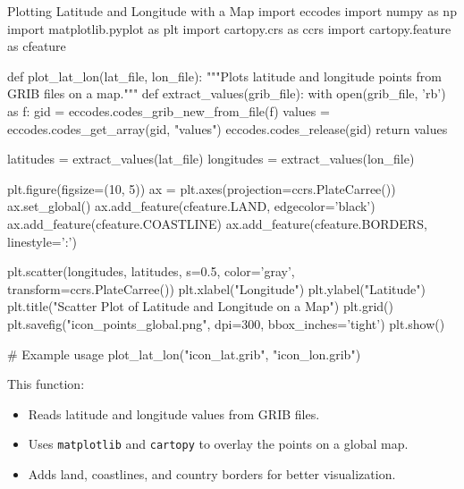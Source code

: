 \begin{codeonly}{Plotting Latitude and Longitude with a Map}
import eccodes
import numpy as np
import matplotlib.pyplot as plt
import cartopy.crs as ccrs
import cartopy.feature as cfeature

def plot_lat_lon(lat_file, lon_file):
    """Plots latitude and longitude points from GRIB files on a map."""
    def extract_values(grib_file):
        with open(grib_file, 'rb') as f:
            gid = eccodes.codes_grib_new_from_file(f)
            values = eccodes.codes_get_array(gid, "values")
            eccodes.codes_release(gid)
        return values
    
    latitudes = extract_values(lat_file)
    longitudes = extract_values(lon_file)
    
    plt.figure(figsize=(10, 5))
    ax = plt.axes(projection=ccrs.PlateCarree())
    ax.set_global()
    ax.add_feature(cfeature.LAND, edgecolor='black')
    ax.add_feature(cfeature.COASTLINE)
    ax.add_feature(cfeature.BORDERS, linestyle=':')
    
    plt.scatter(longitudes, latitudes, s=0.5, color='gray', transform=ccrs.PlateCarree())
    plt.xlabel("Longitude")
    plt.ylabel("Latitude")
    plt.title("Scatter Plot of Latitude and Longitude on a Map")
    plt.grid()
    plt.savefig("icon_points_global.png", dpi=300, bbox_inches='tight')
    plt.show()

# Example usage
plot_lat_lon("icon_lat.grib", "icon_lon.grib")
\end{codeonly}

This function:
\begin{itemize}
    \item Reads latitude and longitude values from GRIB files.
    \item Uses \texttt{matplotlib} and \texttt{cartopy} to overlay the points on a global map.
    \item Adds land, coastlines, and country borders for better visualization.
\end{itemize}

